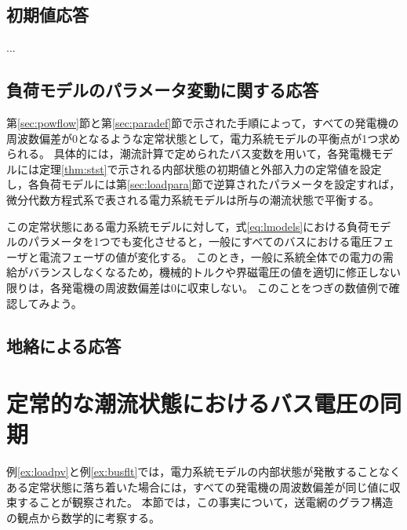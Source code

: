 \documentclass[tombow,dvipdfmx]{corona-a5-1.1}
\begin{document}
\subsection{初期値応答}
...

\subsection{負荷モデルのパラメータ変動に関する応答}\label{sec:resldpara}

第\ref{sec:powflow}節と第\ref{sec:paradef}節で示された手順によって，すべての発電機の周波数偏差が0となるような定常状態として，電力系統モデルの平衡点が1つ求められる。
具体的には，潮流計算で定められたバス変数を用いて，各発電機モデルには定理\ref{thm:stst}で示される内部状態の初期値と外部入力の定常値を設定し，各負荷モデルには第\ref{sec:loadpara}節で逆算されたパラメータを設定すれば，微分代数方程式系で表される電力系統モデルは所与の潮流状態で平衡する。

この定常状態にある電力系統モデルに対して，式\ref{eq:lmodels}における負荷モデルのパラメータを1つでも変化させると，一般にすべてのバスにおける電圧フェーザと電流フェーザの値が変化する。
このとき，一般に系統全体での電力の需給がバランスしなくなるため，機械的トルクや界磁電圧の値を適切に修正しない限りは，各発電機の周波数偏差は0に収束しない。
このことをつぎの数値例で確認してみよう。

\begin{例}[負荷モデルのパラメータを変化させたときの電力系統モデルの時間応答]\label{ex:loadpv}
\end{例}


\subsection{地絡による応答}

\begin{例}[バス地絡が発生したときの電力系統モデルの時間応答]\label{ex:busflt}
\end{例}




\section{定常的な潮流状態におけるバス電圧の同期\advanced}\label{sec:phsync}

例\ref{ex:loadpv}と例\ref{ex:busflt}では，電力系統モデルの内部状態が発散することなくある定常状態に落ち着いた場合には，すべての発電機の周波数偏差が同じ値に収束することが観察された。
本節では，この事実について，送電網のグラフ構造の観点から数学的に考察する。
\end{document}
